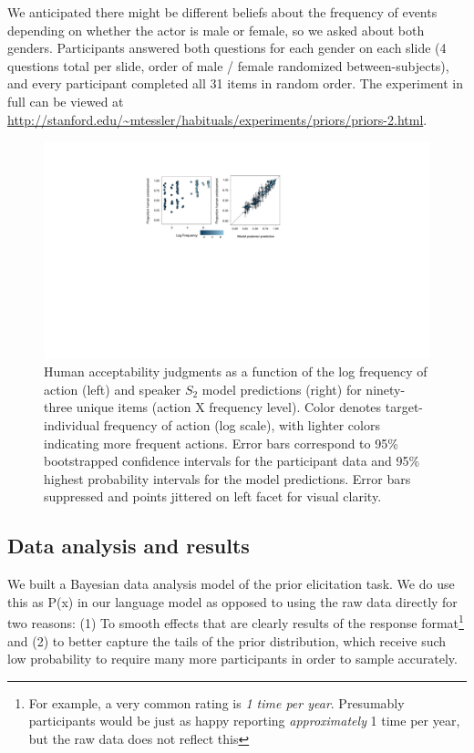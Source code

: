\documentclass[10pt,letterpaper]{article}
\newcommand{\ndg}[1]{\textcolor{Green}{[ndg: #1]}}
\begin{document}
We anticipated there might be different beliefs about the frequency of events depending on whether the actor is male or female, so we asked about both genders. Participants answered both questions for each gender on each slide (4 questions total per slide, order of male / female randomized between-subjects), and every participant completed all 31 items in random order.
The experiment in full can be viewed at \url{http://stanford.edu/~mtessler/habituals/experiments/priors/priors-2.html}.

\begin{figure}[t]
\centering
  \includegraphics[width=\textwidth]{tj-scatters}
  \caption{Human acceptability judgments as a function of the log frequency of action (left) and speaker $S_2$ model predictions (right) for ninety-three unique items (action X frequency level). 
  Color denotes target-individual frequency of action (log scale), with lighter colors indicating more frequent actions. Error bars correspond to 95\% bootstrapped confidence intervals for the participant data and 95\% highest probability intervals for the model predictions. Error bars suppressed and points jittered on left facet for visual clarity.}
  \label{fig:tjScatters}
\end{figure}


\subsection{Data analysis and results}
We built a Bayesian data analysis model of the prior elicitation task.
We do use this as P(x) in our language model as opposed to using the raw data directly for two reasons: (1) To smooth effects that are clearly results of the response format\footnote{For example, a very common rating is \emph{1 time per year}. Presumably participants would be just as happy reporting \emph{approximately} 1 time per year, but the raw data does not reflect this} 
and (2) to better capture the tails of the prior distribution, which receive such low probability to require many more participants in order to sample accurately.
\end{document}
